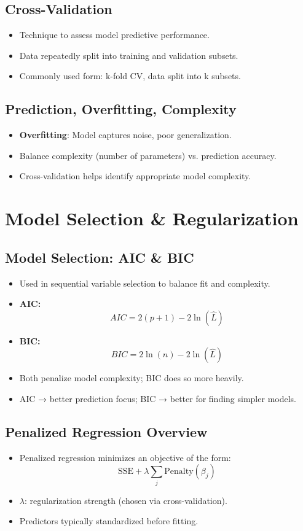 \documentclass[10pt, landscape]{article}
\begin{document}
\begin{multicols}{3}
\subsection{Cross-Validation}
\begin{itemize}[noitemsep]
    \item Technique to assess model predictive performance.
    \item Data repeatedly split into training and validation subsets.
    \item Commonly used form: k-fold CV, data split into k subsets.
\end{itemize}

\subsection{Prediction, Overfitting, Complexity}
\begin{itemize}[noitemsep]
    \item \textbf{Overfitting}: Model captures noise, poor generalization.
    \item Balance complexity (number of parameters) vs. prediction accuracy.
    \item Cross-validation helps identify appropriate model complexity.
\end{itemize}

\section{Model Selection \& Regularization}

\subsection{Model Selection: AIC \& BIC}
\begin{itemize}[noitemsep]
    \item Used in sequential variable selection to balance fit and complexity.
    \item \textbf{AIC:} 
    \[
    AIC = 2(p+1) - 2\ln(\hat{L})
    \]
    \item \textbf{BIC:} 
    \[
    BIC = 2\ln(n) - 2\ln(\hat{L})
    \]
    \item Both penalize model complexity; BIC does so more heavily.
    \item AIC → better prediction focus; BIC → better for finding simpler models.
\end{itemize}

\subsection*{Penalized Regression Overview}
\begin{itemize}[noitemsep]
    \item Penalized regression minimizes an objective of the form:
    \[
    \text{SSE} + \lambda \sum_j \text{Penalty}(\beta_j)
    \]
    \item \(\lambda\): regularization strength (chosen via cross-validation).
    \item Predictors typically standardized before fitting.
\end{itemize}


\end{multicols}
\end{document}
